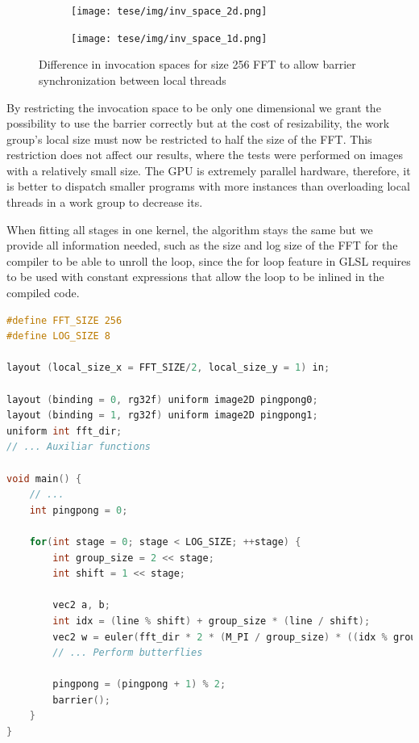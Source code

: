 \documentclass[
  oneside,
  11pt, a4paper,
  footinclude=true,
  headinclude=true,
  cleardoublepage=empty
]{scrbook}
\begin{document}
\begin{figure}[h] 
    \begin{subfigure}{.5\textwidth}
        \centering
        \texttt{[image: tese/img/inv\_space\_2d.png]}
    \end{subfigure}
    \begin{subfigure}{.5\textwidth}
        \centering
        \texttt{[image: tese/img/inv\_space\_1d.png]}
    \end{subfigure}
    \caption{Difference in invocation spaces for size 256 FFT to allow barrier synchronization between local threads}
    \label{fig:invocation-space}
\end{figure}

By restricting the invocation space to be only one dimensional we grant the possibility to use the barrier correctly but at the cost of resizability, the work group's local size must now be restricted to half the size of the FFT. This restriction does not affect our results, where the tests were performed on images with a relatively small size. The GPU is extremely parallel hardware, therefore, it is better to dispatch smaller programs with more instances than overloading local threads in a work group to decrease its.
\newline 

When fitting all stages in one kernel, the algorithm stays the same but we provide all information needed, such as the size and log size of the FFT for the compiler to be able to unroll the loop, since the for loop feature in GLSL requires to be used with constant expressions that allow the loop to be inlined in the compiled code.
\newline 

\begin{lstlisting}[language=C,caption={Unique pass structure for Cooley-Tukey}]
#define FFT_SIZE 256
#define LOG_SIZE 8

layout (local_size_x = FFT_SIZE/2, local_size_y = 1) in;

layout (binding = 0, rg32f) uniform image2D pingpong0;
layout (binding = 1, rg32f) uniform image2D pingpong1;
uniform int fft_dir;
// ... Auxiliar functions

void main() {
    // ...
    int pingpong = 0;
    
    for(int stage = 0; stage < LOG_SIZE; ++stage) {
        int group_size = 2 << stage;
        int shift = 1 << stage;

        vec2 a, b;
        int idx = (line % shift) + group_size * (line / shift);
        vec2 w = euler(fft_dir * 2 * (M_PI / group_size) * ((idx % group_size) % shift));
        // ... Perform butterflies

        pingpong = (pingpong + 1) % 2;
        barrier();
    }
}
\end{lstlisting}
\end{document}
